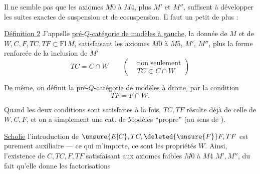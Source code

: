 
 Il ne semble pas que les axiomes
$M0$ à $M4$, plus $M'$ et $M''$, suffisent à
développer les suites exactes de suspension et
de cosuspension. Il faut un petit
 de plus :

\uline{Définition 2} J'appelle \uline{pré-$Q$-catégorie de modèles à gauche}, la donnée de  $M$ et de
$W,C,F,TC,TF\subset\mathrm{Fl}\,M$, satisfaisant les axiomes
$M0$ à $M5$, $M'$, $M''$, plus la forme renforcée
de la  inclusion de $M'$
\[
 TC=C\cap W\qquad\left(\begin{aligned}&\text{non seulement}\\&TC\subset C\cap W\end{aligned}\right) \tag*{$M'_0(g)$}
\]

De même, on définit la \uline{pré-$Q$-catégorie de modèles à droite}, par la condition
\[
 TF=F\cap W. \tag*{$M'_0(d)$}
\]

 Quand les deux conditions sont satisfaites
à la fois,   $TC,TF$ résulte déjà de
celle de $W,C,F$, et on a simplement
une cat. de Modèles ``propre'' (au sens
de ).

\uline{Scholie}   l'introduction
de $\unsure{E|C},TC,\deleted{\unsure{F}}F,TF$ est purement auxiliaire
--- ce qui m'importe, ce sont les propriétés
 $W$. Ainsi, l'existence de $C,TC,F,TF$
satisfaisant aux axiomes faibles $M0$ à $M4$
$M',M''$, du fait qu'elle  donne les factorisations

